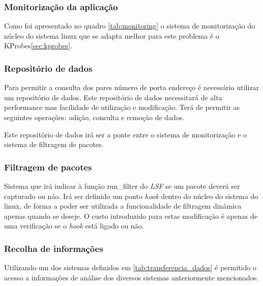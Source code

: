 \subsubsection{Monitorização da aplicação}

Como foi apresentado no quadro \ref{tab:monitoring} o sistema de monitorização
do núcleo do sistema linux que se adapta melhor para este problema é o
KProbes\ref{sec:kprobes}. 

\subsubsection{Repositório de dados}

Para permitir a consulta dos pares número de porta endereço é necessário
utilizar um repositório de dados. Este repositório de dados necessitará de alta
performance mas facilidade de utilização e modificação. Terá de permitir as
seguintes operações: adição, consulta e remoção de dados.

Este repositório de dados irá ser a ponte entre o sistema de  monitorização e o
sistema de filtragem de pacotes. 

\subsubsection{Filtragem de pacotes}

Sistema que irá indicar à função run\_filter do \textit{LSF} se um pacote deverá
ser capturado ou não. Irá ser definido um ponto \textit{hook} dentro do núcleo
do sistema do linux, de forma a poder ser utilizada a funcionalidade de
filtragem dinâmica apenas quando se deseje. O custo introduzido para estas
modificação é apenas de uma verificação se o \textit{hook} está ligado ou não.


\subsubsection{Recolha de informações}

Utilizando um dos sistemas definidos em \ref{tab:transferencia_dados} é
permitido o acesso a informações de análise dos diversos sistemas anteriormente
mencionados.



